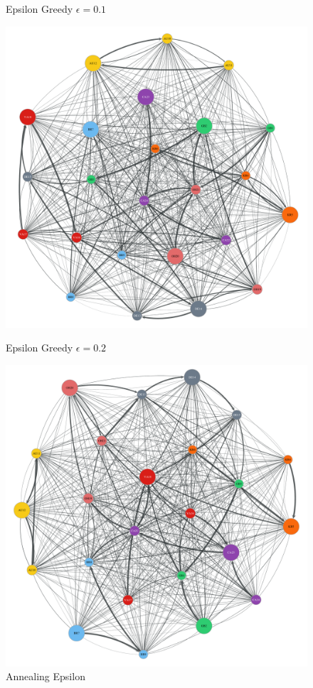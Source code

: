 \begin{figure}[t]
      \caption{Epsilon Greedy $\epsilon=0.1$}\label{fig:epsilon_greedy_e1}
    \endminipage
\end{figure}

\begin{figure}[t]
    \centering
      \includegraphics[width=\linewidth]{figures/b-epsilon-greedy-0-2-e3}
      \caption{Epsilon Greedy $\epsilon=0.2$}\label{fig:epsilon_greedy_e2}
  \endminipage\hfill
    \includegraphics[width=\linewidth]{figures/b-annealing-epsilon-greedy-e5}
    \caption{Annealing Epsilon}\label{fig:annealing_epsilon}
  \endminipage
\end{figure}


